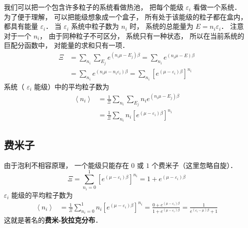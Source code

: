 我们可以把一个包含许多粒子的系统看做热池， 把每个能级 ${\varepsilon _i}$ 看做一个系统． 为了便于理解， 可以把能级想象成一个盒子， 所有处于该能级的粒子都在盒内， 都具有能量 ${\varepsilon _i}$．  当 ${\varepsilon _i}$ 系统中粒子数为 ${n_i}$ 时， 系统的总能量为 $E = {n_i}{\varepsilon _i}$．  注意对于一个 ${n_i}$，  由于同种粒子不可区分， 系统只有一种状态， 所以在当前系统的巨配分函数中， 对能量的求和只有一项．
\begin{equation}
  \begin{aligned}
  \Xi & = \sum\limits_{{n_i}}^{} {\sum\limits_{{E_j}}^{} {{e^{\left( {{n_i}\mu  - {E_j}} \right)\beta }}} }  = \sum\limits_{{n_i}}^{} {{e^{\left( {{n_i}\mu  - E} \right)\beta }}}  \\
  & = \sum\limits_{{n_i}}^{} {{e^{\left( {{n_i}\mu  - {n_i}{\varepsilon _i}} \right)\beta }}}  = \sum\limits_{{n_i}}^{} {{{\left[ {{e^{\left( {\mu  - {\varepsilon _i}} \right)\beta }}} \right]}^{{n_i}}}}
  \end{aligned}
\end{equation}
系统（ ${\varepsilon _i}$ 能级）中的平均粒子数为
\begin{equation}
\begin{aligned}
  \left\langle {{n_i}} \right\rangle  & = \frac{1}{\Xi }\sum\limits_{{n_i}}^{} {\sum\limits_{{E_j}}^{} {{n_i}{e^{\left( {{n_i}\mu  - {E_j}} \right)\beta }}} }  \\
  & = \frac{1}{\Xi }\sum\limits_{{n_i}}^{} {{n_i}{{\left[ {{e^{\left( {\mu  - {\varepsilon _i}} \right)\beta }}} \right]}^{{n_i}}}}
\end{aligned}
\end{equation}
\subsection{费米子}
由于泡利不相容原理， 一个能级只能存在 $0$ 或 $1$ 个费米子（这里忽略自旋）．
\begin{equation}
  \Xi  = \sum\limits_{{n_i} = 0}^1 {{{\left[ {{e^{\left( {\mu  - {\varepsilon _i}} \right)\beta }}} \right]}^{{n_i}}}}  = 1 + {e^{\left( {\mu  - {\varepsilon _i}} \right)\beta }}
\end{equation}
 ${\varepsilon _i}$ 能级的平均粒子数为
\begin{equation}
\begin{aligned}
\left\langle {{n_i}} \right\rangle & = \frac{1}{\Xi }\sum\limits_{{n_i} = 0}^1 {{n_i}{{\left[ {{e^{\left( {\mu  - {\varepsilon _i}} \right)\beta }}} \right]}^{{n_i}}}} = \frac{{0 + {e^{\left( {\mu  - {\varepsilon _i}} \right)\beta }}}}{{1 + {e^{\left( {\mu  - {\varepsilon _i}} \right)\beta }}}}  = \frac{1}{{{e^{\left( {{\varepsilon _i} - \mu } \right)\beta }} + 1}}
\end{aligned}
\end{equation}
  这就是著名的\textbf{费米-狄拉克分布}．
